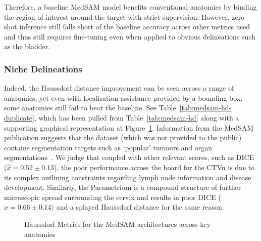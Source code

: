 \documentclass[11pt,twoside]{report}
\begin{document}
Therefore, a baseline MedSAM model benefits conventional anatomies by binding the region of interest around the target with strict supervision. However, zero-shot inference still falls short of the baseline accuracy across other metrics used and thus still requires fine-tuning even when applied to obvious delineations such as the bladder.

\subsubsection{Niche Delineations}

Indeed, the Haussdorf distance improvement can be seen across a range of anatomies, yet even with localisation assistance provided by a bounding box, some anatomies still fail to beat the baseline. See Table~\ref{tab:medsam-hd-duplicate}, which has been pulled from Table~\ref{tab:medsam-hd} along with a supporting graphical representation at Figure~\ref{fig:medsam-hausdorf-analysis}. Information from the MedSAM publication suggests that the dataset (which was not provided to the public) contains segmentation targets such as `popular' tumours and organ segmentations~\cite{Ma2024}. We judge that coupled with other relevant scores, such as DICE ($\hat{x} = 0.52 \pm 0.13$), the poor performance across the board for the CTVn is due to its complex outlining constraints regarding lymph node information and disease development. Similarly, the Parametrium is a compound structure of further microscopic spread surrounding the cervix and results in poor DICE ($\hat{x} = 0.66 \pm 0.14)$ and a splayed Haussdorf distance for the same reason.

\begin{figure}[H]
  \centering
  \caption{Haussdorf Metrics for the MedSAM architectures across key anatomies}\label{fig:medsam-hausdorf-analysis}
\end{figure}
\end{document}
